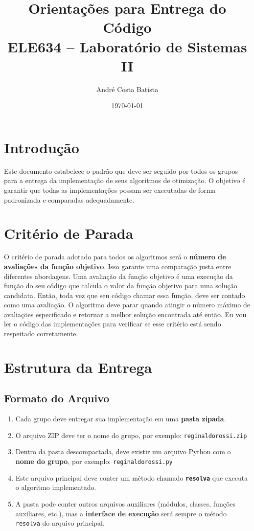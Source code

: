 \documentclass[12pt,a4paper]{article}
\title{\textbf{Orientações para Entrega do Código}\\[0.5cm]
\large ELE634 -- Laboratório de Sistemas II}
\author{André Costa Batista}
\date{\today}
\begin{document}
\maketitle

\section{Introdução}

Este documento estabelece o padrão que deve ser seguido por todos os grupos para a entrega da implementação de seus algoritmos de otimização. O objetivo é garantir que todas as implementações possam ser executadas de forma padronizada e comparadas adequadamente.

\section{Critério de Parada}

O critério de parada adotado para todos os algoritmos será o \textbf{número de avaliações da função objetivo}. Isso garante uma comparação justa entre diferentes abordagens. Uma avaliação da função objetivo é uma execução da função do seu código que calcula o valor da função objetivo para uma solução candidata. Então, toda vez que seu código chamar essa função, deve ser contado como uma avaliação. O algoritmo deve parar quando atingir o número máximo de avaliações especificado e retornar a melhor solução encontrada até então. Eu vou ler o código das implementações para verificar se esse critério está sendo respeitado corretamente.

\section{Estrutura da Entrega}

\subsection{Formato do Arquivo}

\begin{enumerate}[label=\arabic*.]
    \item Cada grupo deve entregar sua implementação em uma \textbf{pasta zipada}.
    
    \item O arquivo ZIP deve ter o nome do grupo, por exemplo: \texttt{reginaldorossi.zip}

    \item Dentro da pasta descompactada, deve existir um arquivo Python com o \textbf{nome do grupo}, por exemplo: \texttt{reginaldorossi.py}

    \item Este arquivo principal deve conter um método chamado \texttt{\textbf{resolva}} que executa o algoritmo implementado.
    
    \item A pasta pode conter outros arquivos auxiliares (módulos, classes, funções auxiliares, etc.), mas a \textbf{interface de execução} será sempre o método \texttt{resolva} do arquivo principal.
\end{enumerate}
\end{document}
